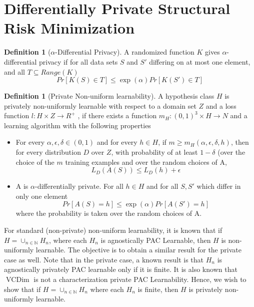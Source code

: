 \documentclass[a4paper]{article}
\DeclareMathOperator{\vcdim}{VCDim}
\theoremstyle{definition}
\newtheorem{definition}[theorem]{Definition}
\theoremstyle{remark}
\begin{document}

\section{Differentially Private Structural Risk Minimization}

\begin{definition}[$\alpha$-Differential Privacy]
A randomized function $K$ gives $\alpha$-differential privacy if for all data sets $S$ and $S'$ differing on at most one element, and all $T \subseteq Range(K)$
$$Pr [K(S) \in T] \le \exp(\alpha) Pr [K(S') \in T]$$
\end{definition}

\begin{definition}[Private Non-uniform learnability] A hypothesis class $H$ is privately non-uniformly learnable with respect to a domain set $Z$ and a loss function $l: H \times Z \rightarrow R^+$ , if there exists a function $m_H: (0, 1)^3\times H \rightarrow N$ and a learning algorithm with the following properties
\begin{itemize}[nolistsep,noitemsep]
\item For every $\alpha, \epsilon, \delta \in (0, 1)$ and for every $h \in H$, if $m \ge m_H(\alpha, \epsilon, \delta, h)$, then for every distribution $D$ over $Z$, with probability of at least $1-\delta$ (over the choice of the $m$ training examples and over the random choices of A,
$$L_D(A(S)) \le L_D(h) + \epsilon$$
\item A is $\alpha$-differentially private. For all $h \in H$ and for all $S, S'$ which differ in only one element
$$Pr [A(S) = h] \le \exp(\alpha) Pr [A(S') = h]$$
where the probability is taken over the random choices of A.
\end{itemize}
\end{definition}

\noindent For standard (non-private) non-uniform learnability, it is known that if $H = \cup_{n\in \mathbb{N}} H_n$, where each $H_n$ is agnostically PAC Learnable, then $H$ is non-uniformly learnable. The objective is to obtain a similar result for the private case as well. Note that in the private case, a known result is that $H_n$ is agnostically privately PAC learnable only if it is finite. It is also known that $\vcdim$ is not a characterization private PAC Learnability. Hence, we wish to show that if $H = \cup_{n \in \mathbb{N}}H_n$ where each $H_n$ is finite, then $H$ is privately non-uniformly learnable.
\end{document}

